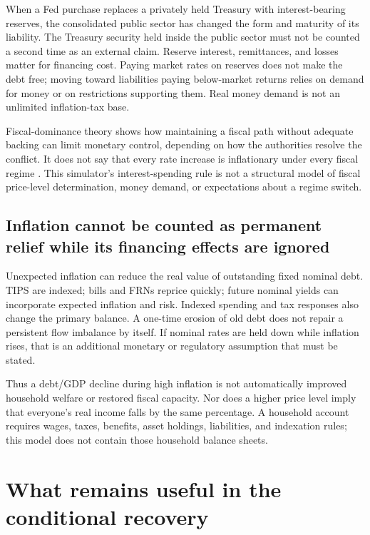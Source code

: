 \documentclass[11pt]{article}
\begin{document}
When a Fed purchase replaces a privately held Treasury with interest-bearing reserves,
the consolidated public sector has changed the form and maturity of its liability.
The Treasury security held inside the public sector must not be counted a second time
as an external claim. Reserve interest, remittances, and losses matter for financing cost.
Paying market rates on reserves does not make the debt free; moving toward liabilities
paying below-market returns relies on demand for money or on restrictions supporting them.
Real money demand is not an unlimited inflation-tax base.

Fiscal-dominance theory shows how maintaining a fiscal path without adequate backing can
limit monetary control, depending on how the authorities resolve the conflict. It does
not say that every rate increase is inflationary under every fiscal regime
\cite{andolfatto}. This simulator's interest-spending rule is not a structural model of
fiscal price-level determination, money demand, or expectations about a regime switch.

\subsection*{Inflation cannot be counted as permanent relief while its financing effects are ignored}

Unexpected inflation can reduce the real value of outstanding fixed nominal debt. TIPS
are indexed; bills and FRNs reprice quickly; future nominal yields can incorporate expected
inflation and risk. Indexed spending and tax responses also change the primary balance.
A one-time erosion of old debt does not repair a persistent flow imbalance by itself.
If nominal rates are held down while inflation rises, that is an additional monetary or
regulatory assumption that must be stated.

Thus a debt/GDP decline during high inflation is not automatically improved household
welfare or restored fiscal capacity. Nor does a higher price level imply that everyone's
real income falls by the same percentage. A household account requires wages, taxes,
benefits, asset holdings, liabilities, and indexation rules; this model does not contain
those household balance sheets.

\section{What remains useful in the conditional recovery}
\end{document}

